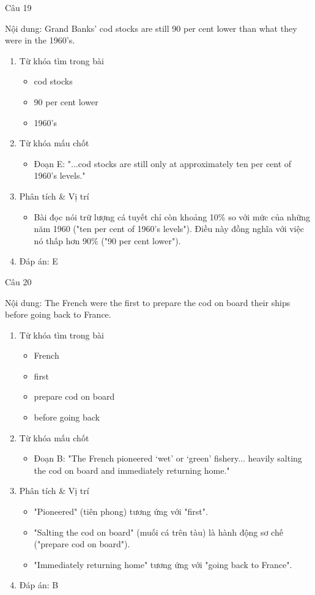 \documentclass{../templateReading/cdreading}
\begin{document}
Câu 19

Nội dung: Grand Banks’ cod stocks are still 90 per cent lower than what they were in the 1960’s.
\begin{enumerate}
\item Từ khóa tìm trong bài
\begin{itemize}
\item cod stocks
\item 90 per cent lower
\item 1960’s
\end{itemize}
\item Từ khóa mấu chốt
\begin{itemize}
\item Đoạn E: "...cod stocks are still only at approximately ten per cent of 1960’s levels."
\end{itemize}
\item Phân tích \& Vị trí
\begin{itemize}
\item Bài đọc nói trữ lượng cá tuyết chỉ còn khoảng 10\% so với mức của những năm 1960 ("ten per cent of 1960’s levels"). Điều này đồng nghĩa với việc nó thấp hơn 90\% ("90 per cent lower").
\end{itemize}
\item Đáp án: E
\end{enumerate}

Câu 20

Nội dung: The French were the first to prepare the cod on board their ships before going back to France.
\begin{enumerate}
\item Từ khóa tìm trong bài
\begin{itemize}
\item French
\item first
\item prepare cod on board
\item before going back
\end{itemize}
\item Từ khóa mấu chốt
\begin{itemize}
\item Đoạn B: "The French pioneered ‘wet’ or ‘green’ fishery... heavily salting the cod on board and immediately returning home."
\end{itemize}
\item Phân tích \& Vị trí
\begin{itemize}
\item "Pioneered" (tiên phong) tương ứng với "first".
\item "Salting the cod on board" (muối cá trên tàu) là hành động sơ chế ("prepare cod on board").
\item "Immediately returning home" tương ứng với "going back to France".
\end{itemize}
\item Đáp án: B
\end{enumerate}
\end{document}
